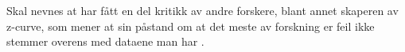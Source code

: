 \documentclass[doc,norsk]{apa7}
\begin{document}
Skal nevnes at \textcite{forskning-fake} har fått en del kritikk av andre forskere, blant annet skaperen av z-curve, som mener at \citeauthor{forskning-fake} sin påstand om at det meste av forskning er feil ikke stemmer overens med dataene man har \parencite{forskning-fake-kritikk}.

\printbibliography
\end{document}
